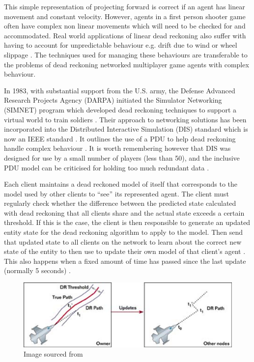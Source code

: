 \documentclass[journal]{IEEEtran}
\begin{document}
This simple representation of projecting forward is correct if an agent has linear movement and constant velocity. However, agents in a first person shooter game often have complex non linear movements which will need to be checked for and accommodated. Real world applications of linear dead reckoning also suffer with having to account for unpredictable behaviour e.g. drift due to wind or wheel slippage \cite{chung2001accurate} \cite{ojeda2004experimental}. The techniques used for managing these behaviours are transferable to the problems of dead reckoning networked multiplayer game agents with complex behaviour.

In 1983, with substantial support from the U.S. army, the Defense Advanced Research Projects Agency (DARPA) initiated the Simulator Networking (SIMNET) program which developed dead reckoning techniques to support a virtual world to train soldiers \cite{calvin1993simnet}. Their approach to networking solutions has been incorporated into the Distributed Interactive Simulation (DIS) standard which is now an IEEE standard \cite{dis1998ieee}. It outlines the use of a PDU to help dead reckoning handle complex behaviour \cite{mccarty1994virtual}. It is worth remembering however that DIS was designed for use by a small number of players (less than 50), and the inclusive PDU model can be criticised for holding too much redundant data \cite{henderson2001latency}.
 
Each client maintains a dead reckoned model of itself that corresponds to the model used by other clients to ``see'' its represented agent. The client must regularly check whether the difference between the predicted state calculated with dead reckoning that all clients share and the actual state exceeds a certain threshold. If this is the case, the client is then responsible to generate an updated entity state for the dead reckoning algorithm to apply to the model. Then send that updated state to all clients on the network to learn about the correct new state of the entity to then use to update their own model of that client's agent \cite{calvin1993simnet} \cite{mauve2000keep}. This also happens when a fixed amount of time has passed since the last update (normally 5 seconds) \cite{mills1992network}.

\begin{figure}[h]
    \centering
    \includegraphics[width=0.7\linewidth]{Threshold1.png}
    \caption{Image sourced from \cite{aronson1997gamasutra}}
    \label{fig:threshold}
\end{figure}
\end{document}
